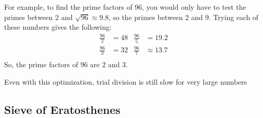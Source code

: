 \documentclass[12pt, titlepage]{article}
\begin{document}
    For example, to find the prime factors of 96, you would only have to test the primes
    between 2 and $\sqrt{96} \approx 9.8$, so the primes between 2 and 9. Trying
    each of these numbers gives the following:
    \begin{align*}
        \frac{96}{2} &= 48 &\frac{96}{5} &= 19.2 \\
        \frac{96}{3} &= 32 &\frac{96}{7} &\approx 13.7\\
    \end{align*}
    So, the prime factors of 96 are 2 and 3.

    Even with this optimization, trial division is still slow for very large numbers 

    \subsection{Sieve of Eratosthenes}
\end{document}
